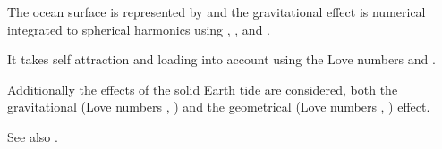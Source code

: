 The ocean surface is represented by  and the gravitational
effect is numerical integrated to spherical harmonics using , ,
and .

It takes self attraction and loading into account using the Love numbers
 and
.

Additionally the effects of the solid Earth tide are considered,
both the gravitational (Love numbers , )
and the geometrical (Love numbers , ) effect.

See also .



